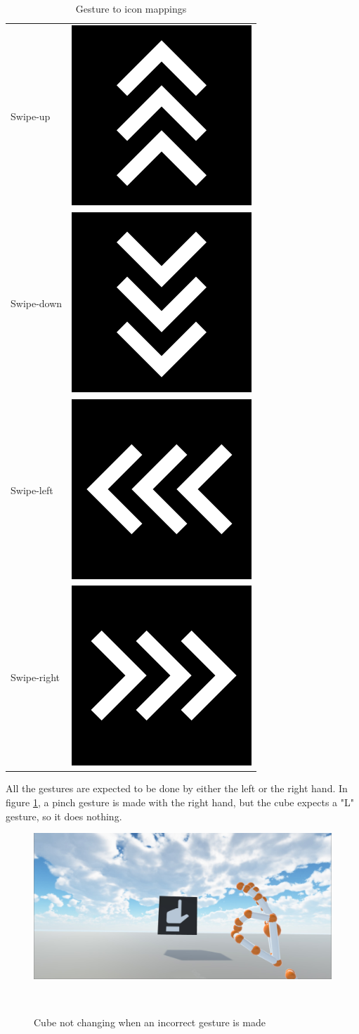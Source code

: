 \documentclass[chi_draft]{sigchi}
\begin{document}
\begin{table}[h]
\begin{tabular}{ m{5em} m{5em} }
    Swipe-up & \includegraphics[width=0.2\columnwidth]{figures/swipe-up.png} \\
    Swipe-down & \includegraphics[width=0.2\columnwidth]{figures/swipe-down.png} \\
    Swipe-left & \includegraphics[width=0.2\columnwidth]{figures/swipe-left.png} \\
    Swipe-right & \includegraphics[width=0.2\columnwidth]{figures/swipe-right.png} \\    
  \end{tabular}
  \caption{Gesture to icon mappings}
  \label{tab:table1}
\end{table}

All the gestures are expected to be done by either the left or the right hand. In figure \ref{fig:figure12}, a pinch gesture is made with the right hand, but the cube expects a "L" gesture, so it does nothing.

\begin{figure}[h]
  \centering
  \includegraphics[width=0.9\columnwidth]{figures/Demo_not_detected.jpg}
  \caption{Cube not changing when an incorrect gesture is made}~\label{fig:figure12}
\end{figure}
\end{document}

